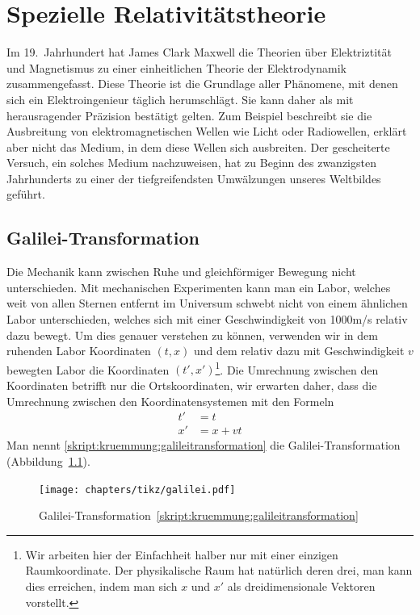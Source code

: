 %
%
%

\chapter{Spezielle Relativitätstheorie%
\label{skript:chapter:spezielle}}
\rhead{}
Im 19.~Jahrhundert hat James Clark Maxwell die Theorien
über Elektriztität und Magnetismus zu einer einheitlichen Theorie
der Elektrodynamik zusammengefasst.
%
%
Diese Theorie ist die Grundlage aller Phänomene, mit denen sich
ein Elektroingenieur täglich herumschlägt.
Sie kann daher als mit herausragender Präzision bestätigt gelten.
Zum Beispiel beschreibt sie die Ausbreitung von elektromagnetischen
Wellen wie Licht oder Radiowellen, erklärt aber nicht das Medium, in
dem diese Wellen sich ausbreiten.
Der gescheiterte Versuch, ein solches Medium nachzuweisen, hat
zu Beginn des zwanzigsten Jahrhunderts zu einer
der tiefgreifendsten Umwälzungen unseres Weltbildes geführt.

\section{Galilei-Transformation}
Die Mechanik kann zwischen Ruhe und gleichförmiger Bewegung nicht 
unterschieden.
Mit mechanischen Experimenten kann man ein Labor, welches weit von
allen Sternen entfernt im Universum schwebt nicht von einem ähnlichen
Labor unterschieden, welches sich mit einer Geschwindigkeit von 1000m/s
relativ dazu bewegt.
Um dies genauer verstehen zu können, verwenden wir in dem ruhenden Labor
Koordinaten $(t,x)$ und dem relativ dazu mit Geschwindigkeit $v$ bewegten
Labor die Koordinaten
$(t',x')$\footnote{Wir arbeiten hier der Einfachheit halber nur mit einer
einzigen Raumkoordinate.
Der physikalische Raum hat natürlich deren drei, man kann dies erreichen,
indem man sich $x$ und $x'$ als dreidimensionale Vektoren vorstellt.}.
Die Umrechnung zwischen den Koordinaten betrifft nur die Ortskoordinaten,
wir erwarten daher, dass die Umrechnung zwischen den Koordinatensystemen
mit den Formeln
\begin{equation}
\begin{aligned}
t'&=t\\
x'&=x+vt
\end{aligned}
\label{skript:kruemmung:galileitransformation}
\end{equation}
%
Man nennt \eqref{skript:kruemmung:galileitransformation} die
Galilei-Transformation (Abbildung~\ref{skript:spezielle:galileigraphik}).
\begin{figure}
\centering
\texttt{[image: chapters/tikz/galilei.pdf]}
\caption{Galilei-Transformation~\eqref{skript:kruemmung:galileitransformation}
\label{skript:spezielle:galileigraphik}}
\end{figure}

